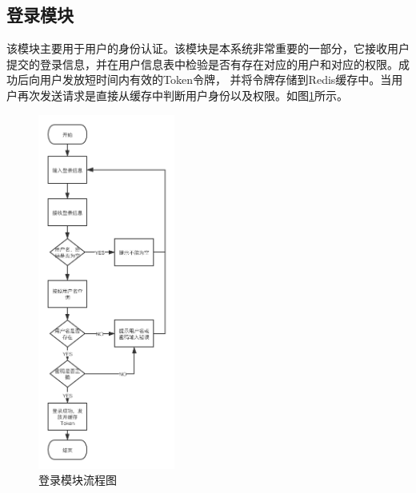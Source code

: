 \subsection{登录模块}
该模块主要用于用户的身份认证。该模块是本系统非常重要的一部分，它接收用户提交的登录信息，并在用户信息表中检验是否有存在对应的用户和对应的权限。成功后向用户发放短时间内有效的Token令牌，
并将令牌存储到Redis缓存中。当用户再次发送请求是直接从缓存中判断用户身份以及权限。如图\ref{figure:login}所示。
\begin{figure}[H]
\centering
\includegraphics[width=0.4\textwidth,keepaspectratio]{data/chapter-5/login.png}
\caption{登录模块流程图}
\label{figure:login}
\end{figure}
